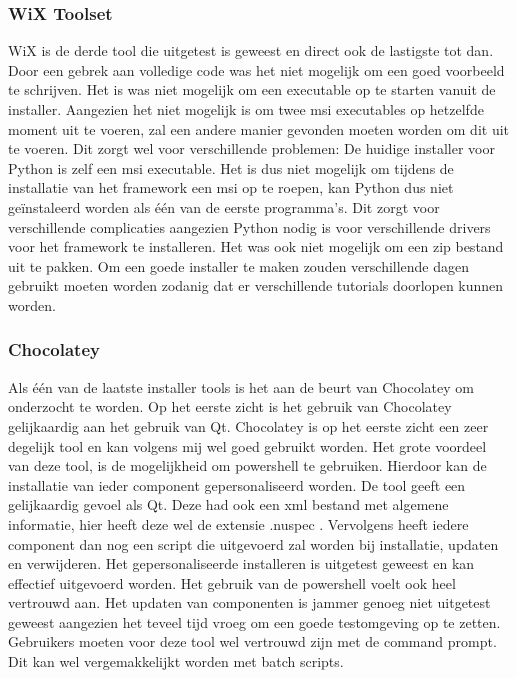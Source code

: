 \documentclass{article}
\begin{document}
\subsubsection{WiX Toolset}
WiX is de derde tool die uitgetest is geweest en direct ook de lastigste tot dan.
Door een gebrek aan volledige code was het niet mogelijk om een goed voorbeeld te schrijven.
Het is was niet mogelijk om een executable op te starten vanuit de installer.
Aangezien het niet mogelijk is om twee msi executables op hetzelfde moment uit te voeren, zal een andere manier gevonden moeten worden om dit uit te voeren.
Dit zorgt wel voor verschillende problemen:
De huidige installer voor Python is zelf een msi executable.
Het is dus niet mogelijk om tijdens de installatie van het framework een msi op te roepen, kan Python dus niet ge\"instaleerd worden als \'e\'en van de eerste programma's.
Dit zorgt voor verschillende complicaties aangezien Python nodig is voor verschillende drivers voor het framework te installeren.
Het was ook niet mogelijk om een zip bestand uit te pakken.
Om een goede installer te maken zouden verschillende dagen gebruikt moeten worden zodanig dat er verschillende tutorials doorlopen kunnen worden.

\subsubsection{Chocolatey}
Als \'e\'en van de laatste installer tools is het aan de beurt van Chocolatey om onderzocht te worden.
Op het eerste zicht is het gebruik van Chocolatey gelijkaardig aan het gebruik van Qt.
Chocolatey is op het eerste zicht een zeer degelijk tool en kan volgens mij wel goed gebruikt worden.
Het grote voordeel van deze tool, is de mogelijkheid om powershell te gebruiken.
Hierdoor kan de installatie van ieder component gepersonaliseerd worden.
De tool geeft een gelijkaardig gevoel als Qt.
Deze had ook een xml bestand met algemene informatie, hier heeft deze wel de extensie .nuspec .
Vervolgens heeft iedere component dan nog een script die uitgevoerd zal worden bij installatie, updaten en verwijderen.
Het gepersonaliseerde installeren is uitgetest geweest en kan effectief uitgevoerd worden.
Het gebruik van de powershell voelt ook heel vertrouwd aan.
Het updaten van componenten is jammer genoeg niet uitgetest geweest aangezien het teveel tijd vroeg om een goede testomgeving op te zetten.
Gebruikers moeten voor deze tool wel vertrouwd zijn met de command prompt.
Dit kan wel vergemakkelijkt worden met batch scripts.
\end{document}
